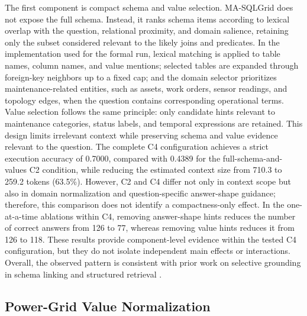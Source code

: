 \documentclass[cmc,article,submit,moreauthors,pdftex]{Definitions/tsp}
\begin{document}
The first component is compact schema and value selection. MA-SQLGrid does not expose the full schema. Instead, it ranks schema items according to lexical overlap with the question, relational proximity, and domain salience, retaining only the subset considered relevant to the likely joins and predicates. In the implementation used for the formal run, lexical matching is applied to table names, column names, and value mentions; selected tables are expanded through foreign-key neighbors up to a fixed cap; and the domain selector prioritizes maintenance-related entities, such as assets, work orders, sensor readings, and topology edges, when the question contains corresponding operational terms. Value selection follows the same principle: only candidate hints relevant to maintenance categories, status labels, and temporal expressions are retained. This design limits irrelevant context while preserving schema and value evidence relevant to the question. The complete C4 configuration achieves a strict execution accuracy of 0.7000, compared with 0.4389 for the full-schema-and-values C2 condition, while reducing the estimated context size from 710.3 to 259.2 tokens (63.5\%). However, C2 and C4 differ not only in context scope but also in domain normalization and question-specific answer-shape guidance; therefore, this comparison does not identify a compactness-only effect. In the one-at-a-time ablations within C4, removing answer-shape hints reduces the number of correct answers from 126 to 77, whereas removing value hints reduces it from 126 to 118. These results provide component-level evidence within the tested C4 configuration, but they do not isolate independent main effects or interactions. Overall, the observed pattern is consistent with prior work on selective grounding in schema linking and structured retrieval \cite{lei2020reexamining,lin2020bridging,quamar2022natural,xie2022unifiedskg}.

\subsection{Power-Grid Value Normalization}\label{sect:m4}
\end{document}
